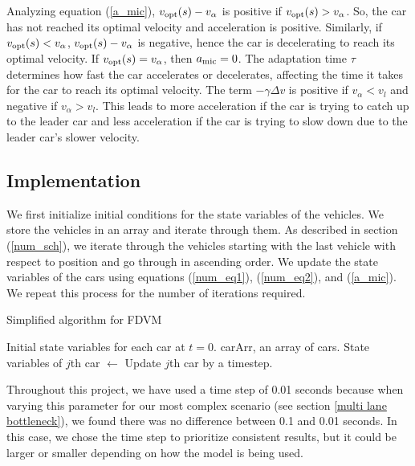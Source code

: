\documentclass[12pt]{article}
\begin{document}
    Analyzing equation (\ref{a_mic}), $v_{\rm opt} (s) - v_\alpha$ is positive if $v_{\rm opt} (s) > v_\alpha$. So, the car has not reached its optimal velocity and acceleration is positive. Similarly, if  $v_{\rm opt} (s) < v_\alpha$, $v_{\rm opt} (s) - v_\alpha$ is negative, hence the car is decelerating to reach its optimal velocity. If $v_{\rm opt} (s) = v_\alpha$, then $a_{\rm mic} = 0$. The adaptation time $\tau$ determines how fast the car accelerates or decelerates, affecting the time it takes for the car to reach its optimal velocity. The term $-\gamma \Delta v$ is positive if $v_\alpha < v_l$ and negative if $v_\alpha > v_l$. This leads to more acceleration if the car is trying to catch up to the leader car and less acceleration if the car is trying to slow down due to the leader car's slower velocity. 
  
    \subsection{Implementation}\label{sec:implementation}
    We first initialize initial conditions for the state variables of the vehicles. We store the vehicles in an array and iterate through them. As described in section (\ref{num_sch}), we iterate through the vehicles starting with the last vehicle with respect to position and go through in ascending order. We update the state variables of the cars using equations (\ref{num_eq1}), (\ref{num_eq2}), and (\ref{a_mic}). We repeat this process for the number of iterations required. 
    \begin{algorithm}
      \caption{Simplified algorithm for FDVM}\label{alg:car-following}
      \begin{algorithmic}
      \Require Initial state variables for each car at $t=0$. 
      \Require carArr, an array of cars.
        \State State variables of $j$th car $\gets$ Update $j$th car by a timestep.
        \EndFor
      \EndFor
      \end{algorithmic}
      \end{algorithm}
      
      Throughout this project, we have used a time step of 0.01 seconds because when varying this parameter for our most complex scenario (see section \ref{multi lane bottleneck}), we found there was no difference between 0.1 and 0.01 seconds. In this case, we chose the time step to prioritize consistent results, but it could be larger or smaller depending on how the model is being used.
      
\end{document}
